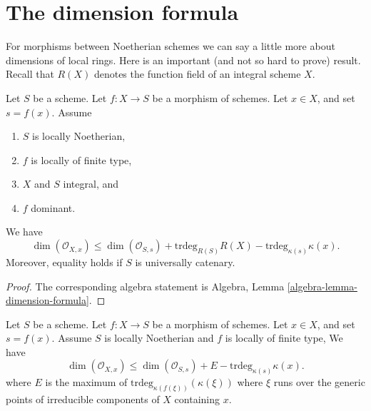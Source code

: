 \section{The dimension formula}
\label{section-dimension-formula}

\noindent
For morphisms between Noetherian schemes we can say a little more
about dimensions of local rings. Here is an important (and not so
hard to prove) result. Recall that $R(X)$ denotes the function field
of an integral scheme $X$.

\begin{lemma}
\label{lemma-dimension-formula}
Let $S$ be a scheme.
Let $f : X \to S$ be a morphism of schemes.
Let $x \in X$, and set $s = f(x)$.
Assume
\begin{enumerate}
\item $S$ is locally Noetherian,
\item $f$ is locally of finite type,
\item $X$ and $S$ integral, and
\item $f$ dominant.
\end{enumerate}
We have
\begin{equation}
\label{equation-dimension-formula}
\dim(\mathcal{O}_{X, x})
\leq
\dim(\mathcal{O}_{S, s}) + \text{trdeg}_{R(S)}R(X)
- \text{trdeg}_{\kappa(s)} \kappa(x).
\end{equation}
Moreover, equality holds if $S$ is universally catenary.
\end{lemma}

\begin{proof}
The corresponding algebra statement is
Algebra, Lemma \ref{algebra-lemma-dimension-formula}.
\end{proof}

\begin{lemma}
\label{lemma-dimension-formula-general}
Let $S$ be a scheme. Let $f : X \to S$ be a morphism of schemes.
Let $x \in X$, and set $s = f(x)$. Assume $S$ is locally Noetherian
and $f$ is locally of finite type,
We have
\begin{equation}
\label{equation-dimension-formula-general}
\dim(\mathcal{O}_{X, x})
\leq
\dim(\mathcal{O}_{S, s}) + E - \text{trdeg}_{\kappa(s)} \kappa(x).
\end{equation}
where $E$ is the maximum of $\text{trdeg}_{\kappa(f(\xi))}(\kappa(\xi))$
where $\xi$ runs over the generic points of irreducible components
of $X$ containing $x$.
\end{lemma}

